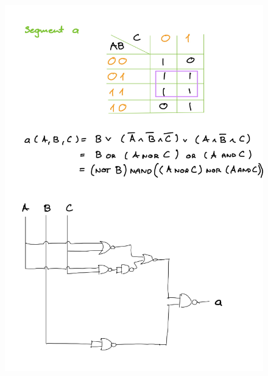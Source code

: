 \documentclass[14pt, table]{extarticle}
\begin{document}
\begin{figure}[H]
\includegraphics[scale=0.2]{Elektronika-22}
\centering
\captionsetup{labelformat=empty}
\caption{}
\end{figure}
\end{document}
